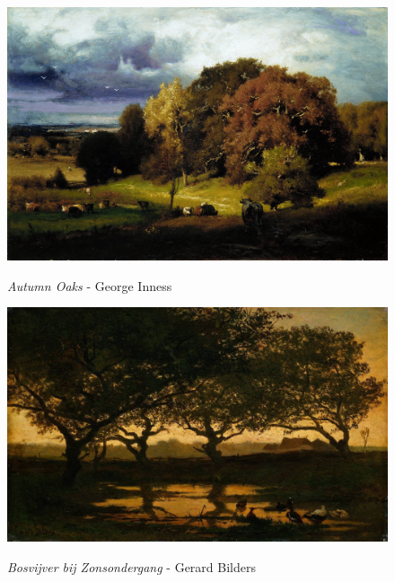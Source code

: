 \documentclass[a4paper]{article}
\begin{document}
\begin {figure}[h!]
\centering
\begin{minipage}[b]{.49\textwidth}
	\centering
	\includegraphics[width=\textwidth]{ForestPaintings/_Ext__Stl__George_Inness_-_Autumn_Oaks.jpg}
    \caption{\emph{Autumn Oaks} - George Inness}
\end{minipage}
\hfill
\begin{minipage}[b]{.49\textwidth}
	\centering
	\includegraphics[width=\textwidth]{ForestPaintings/_Ext__Gerard_Bilders_-_Bosvijver_bij_Zonsondergang.jpg}
    \caption{\emph{Bosvijver bij Zonsondergang} - Gerard Bilders}
\end{minipage}
\end{figure}
\end{document}
